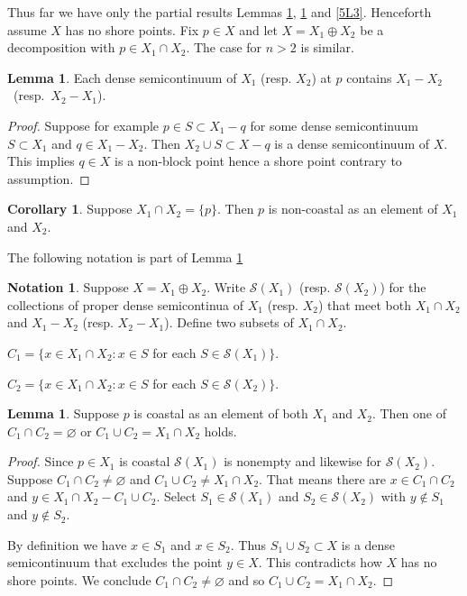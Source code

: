 \documentclass[12pt]{article}
\theoremstyle{plain}
\theoremstyle{definition}
\newtheorem{lemma}[theorem]{Lemma}
\newtheorem{corollary}[theorem]{Corollary}
\newtheorem{notation}[theorem]{Notation}
\newcommand{\0}{\ensuremath{\varnothing}}
\newcommand{\cS}{\ensuremath{\mathcal S}}
\begin{document}
Thus far we have only the partial results Lemmas \ref{5L1}, \ref{5L2} and \ref{5L3}.
Henceforth assume $X$ has no shore points. Fix $p \in X$ and let $X=X_1 \oplus X_2$ be a decomposition with $p \in X_1 \cap X_2$.
The case for $n > 2$ is similar.

\begin{lemma}\label{5L1}
Each dense semicontinuum of $X_1$ (resp. $X_2$) at $p$ contains \mbox{$X_1-X_2$ (resp. $X_2 - X_1$)}.
\end{lemma}

\begin{proof}
Suppose for example $p \in S \subset X_1 - q$ for some dense semicontinuum $S \subset X_1$ and $q \in X_1 - X_2$.
Then $X_2 \cup S \subset X-q$ is a dense semicontinuum of $X$.
This implies $q \in X$ is a non-block point hence a shore point contrary to assumption.
\end{proof}

\begin{corollary}\label{singleton}
Suppose $X_1 \cap X_2 = \{p\}$. Then $p$ is non-coastal as an element of $X_1$ and $X_2$.
\end{corollary}

The following notation is part of Lemma \ref{5L2}

\begin{notation}
Suppose $X=X_1 \oplus X_2$. 
Write $\cS(X_1)$ (resp. $\cS(X_2)$) for the collections of proper dense semicontinua of $X_1$ (resp. $X_2$)
that meet both \mbox{$X_1 \cap X_2$} and $X_1 - X_2$ (resp. $X_2 - X_1$).
Define two subsets of $X_1 \cap X_2$.

\begin{center}
	$C_1 =  \{x \in X_1 \cap X_2: x \in S$ for each $S \in \cS(X_1)\}$.
	\vspace{2mm}
	
	$C_2 = \{x \in X_1 \cap X_2: x \in S$ for each $S \in \cS(X_2)\}$.
\end{center}\vspace{2mm}
\end{notation}
\vspace{-7mm}

\begin{lemma}\label{5L2}
Suppose $p$ is coastal as an element of both $X_1$ and $X_2$. 
Then one of $C_1 \cap C_2= \0$ or $C_1 \cup C_2 = X_1 \cap X_2 $ holds.
\end{lemma}

\begin{proof}
Since $p \in X_1$ is coastal $\cS(X_1)$ is nonempty and likewise for $\cS(X_2)$.
Suppose $C_1 \cap C_2 \ne \0$ and $C_1 \cup C_2 \ne X_1 \cap X_2 $.
That means there are $x \in C_1 \cap C_2$ and $y \in X_1 \cap X_2 -C_1 \cup C_2$.
Select $S_1 \in \cS(X_1)$ and $S_2 \in \cS(X_2)$ with $y \notin S_1$ and $y \notin S_2$.

By definition we have $x \in S_1$ and $x \in S_2$.
Thus $S_1 \cup S_2 \subset X$ is a dense semicontinuum that excludes the point $y \in X$.
This contradicts how $X$ has no shore points.
We conclude $C_1 \cap C_2 \ne \0$ and so $C_1 \cup C_2 = X_1 \cap X_2$.
\end{proof}
\end{document}
